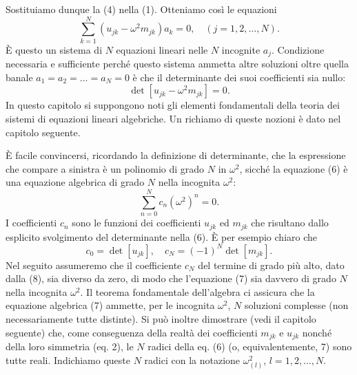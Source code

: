 \documentclass[11pt, a4paper]{book}
\numberwithin{equation}{section}
\begin{document}
Sostituiamo dunque la (4) nella (1). Otteniamo così le equazioni
\begin{equation}
\sum_{k=1}^{N} (u_{jk} - \omega^2 m_{jk}) a_k = 0, \quad (j = 1, 2, \dots, N).
\end{equation}
È questo un sistema di $N$ equazioni lineari nelle $N$ incognite $a_j$. Condizione necessaria e sufficiente perché questo sistema ammetta altre soluzioni oltre quella banale $a_1 = a_2 = \dots = a_N = 0$ è che il determinante dei suoi coefficienti sia nullo:
\begin{equation}
\det [u_{jk} - \omega^2 m_{jk}] = 0.
\end{equation}
In questo capitolo si suppongono noti gli elementi fondamentali della teoria dei sistemi di equazioni lineari algebriche. Un richiamo di queste nozioni è dato nel capitolo seguente.

È facile convincersi, ricordando la definizione di determinante, che la espressione che compare a sinistra è un polinomio di grado $N$ in $\omega^2$, sicché la equazione (6) è una equazione algebrica di grado $N$ nella incognita $\omega^2$:
\begin{equation}
\sum_{n=0}^{N} c_n (\omega^2)^n = 0.
\end{equation}
I coefficienti $c_n$ sono le funzioni dei coefficienti $u_{jk}$ ed $m_{jk}$ che risultano dallo esplicito svolgimento del determinante nella (6). È per esempio chiaro che
\begin{equation}
c_0 = \det [u_{jk}], \quad c_N = (-1)^N \det [m_{jk}].
\end{equation}
Nel seguito assumeremo che il coefficiente $c_N$ del termine di grado più alto, dato dalla (8), sia diverso da zero, di modo che l'equazione (7) sia davvero di grado $N$ nella incognita $\omega^2$. Il teorema fondamentale dell'algebra ci assicura che la equazione algebrica (7) ammette, per le incognita $\omega^2$, $N$ soluzioni complesse (non necessariamente tutte distinte). Si può inoltre dimostrare (vedi il capitolo seguente) che, come conseguenza della realtà dei coefficienti $m_{jk}$ e $u_{jk}$ nonché della loro simmetria (eq. 2), le $N$ radici della eq. (6) (o, equivalentemente, 7) sono tutte reali. Indichiamo queste $N$ radici con la notazione $\omega_{(l)}^2$, $l = 1, 2, \dots, N$.
\end{document}
